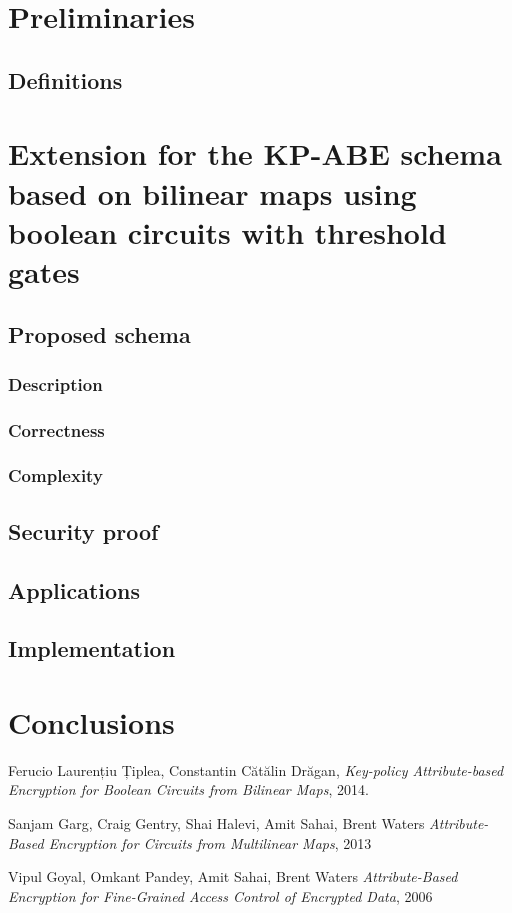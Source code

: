 \documentclass[12pt]{article}
\newcommand\blankpage{%
    \null
    \thispagestyle{empty}%
    \addtocounter{page}{-1}%
    \newpage}
\begin{document}
\section{Preliminaries}
\subsection{Definitions}

\section{Extension for the KP-ABE schema based on bilinear maps using boolean circuits with threshold gates}

\subsection{Proposed schema}

\subsubsection{Description}
\subsubsection{Correctness}
\subsubsection{Complexity}

\subsection{Security proof}

\subsection{Applications}

\subsection{Implementation}

\section{Conclusions}

\pagebreak

\blankpage

\begin{thebibliography}{9}

Ferucio Laurențiu Țiplea, Constantin Cătălin Drăgan, 
\textit{Key-policy Attribute-based Encryption for Boolean Circuits from Bilinear Maps}, 2014.

Sanjam Garg, Craig Gentry, Shai Halevi, Amit Sahai, Brent Waters 
\textit{Attribute-Based Encryption for Circuits from Multilinear Maps}, 2013
 
Vipul Goyal, Omkant Pandey, Amit Sahai, Brent Waters 
\textit{Attribute-Based Encryption for Fine-Grained Access Control of Encrypted Data}, 2006
 
\end{thebibliography}

\vspace{\baselineskip}
\end{document}
